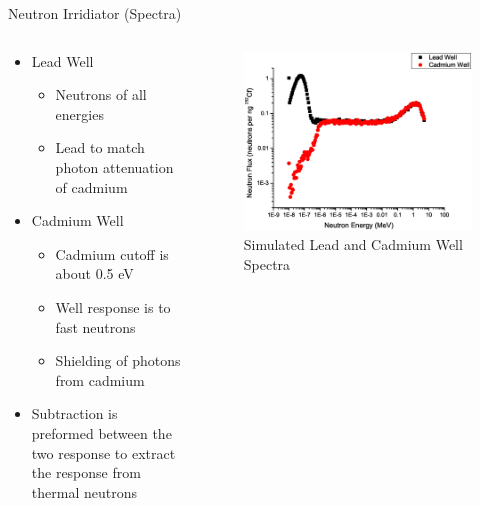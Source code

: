 \begin{frame}{Neutron Irridiator (Spectra)}
\begin{columns}[onlytextwidth]
\begin{column}{0.45\textwidth}
	\begin{itemize}
		\small
		\item Lead Well
		\begin{itemize}
			\tiny
			\item Neutrons of all energies
			\item Lead to match photon attenuation of cadmium
		\end{itemize}
		\small
		\item Cadmium Well
		\begin{itemize}
			\tiny
			\item Cadmium cutoff is about 0.5 eV
			\item Well response is to fast neutrons
			\item Shielding of photons from cadmium
		\end{itemize}
		\small 
		\item Subtraction is preformed between the two response to extract the response from thermal neutrons
	\end{itemize}
\end{column}
\begin{column}{0.45\textwidth}
	\begin{figure}
		\centering
		\includegraphics[width=\textwidth]{images/Graph19N.eps}
		\caption{Simulated Lead and Cadmium Well Spectra}
		\label{fig:SimPbCdSpectra}
	\end{figure}
\end{column}
\end{columns}
\end{frame}
